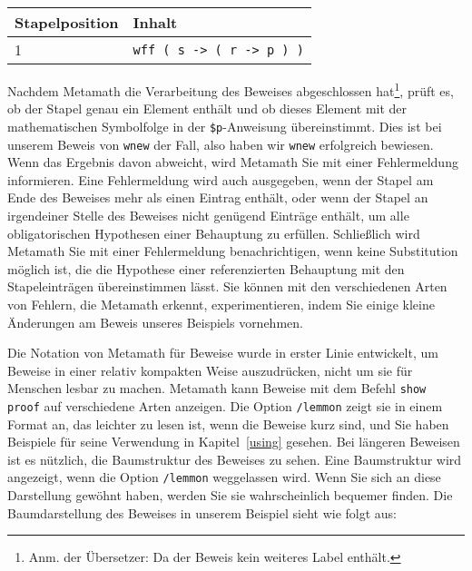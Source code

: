 \begin{center}\begin{tabular}{|l|l|}\hline
{Stapelposition} & {Inhalt} \\ \hline \hline
1 & \texttt{wff ( s -> ( r -> p ) )} \\ \hline
\end{tabular}\end{center}

Nachdem Metamath die Verarbeitung des Beweises abgeschlossen hat\footnote{Anm. der Übersetzer: Da der Beweis kein weiteres Label enthält.}, prüft es, ob der Stapel genau ein Element enthält und ob dieses Element mit der mathematischen Symbolfolge in der \texttt{\$p}-Anweisung übereinstimmt.  Dies ist bei unserem Beweis von \texttt{wnew} der Fall, also haben wir \texttt{wnew} erfolgreich bewiesen.  Wenn das Ergebnis davon abweicht, wird Metamath Sie mit einer Fehlermeldung informieren.  Eine Fehlermeldung wird auch ausgegeben, wenn der Stapel am Ende des Beweises mehr als einen Eintrag enthält, oder wenn der Stapel an irgendeiner Stelle des Beweises nicht genügend Einträge enthält, um alle obligatorischen Hypothesen einer Behauptung zu erfüllen.  Schließlich wird Metamath Sie mit einer Fehlermeldung benachrichtigen, wenn keine Substitution möglich ist, die die Hypothese einer referenzierten Behauptung mit den Stapeleinträgen übereinstimmen lässt.  Sie können mit den verschiedenen Arten von Fehlern, die Metamath erkennt, experimentieren, indem Sie einige kleine Änderungen am Beweis unseres Beispiels vornehmen. 

Die Notation von Metamath für Beweise wurde in erster Linie entwickelt, um Beweise in einer relativ kompakten Weise auszudrücken, nicht um sie für Menschen lesbar zu machen.  Metamath kann Beweise mit dem Befehl \texttt{show proof} auf verschiedene Arten anzeigen.  Die Option \texttt{/lemmon} zeigt sie in einem Format an, das leichter zu lesen ist, wenn die Beweise kurz sind, und Sie haben Beispiele für seine Verwendung in Kapitel~\ref{using} gesehen.  Bei längeren Beweisen ist es nützlich, die Baumstruktur des Beweises zu sehen.  Eine Baumstruktur wird angezeigt, wenn die Option \texttt{/lemmon} weggelassen wird.  Wenn Sie sich an diese Darstellung gewöhnt haben, werden Sie sie wahrscheinlich bequemer finden. Die Baumdarstellung des Beweises in unserem Beispiel sieht wie folgt aus:\label{treeproof}

